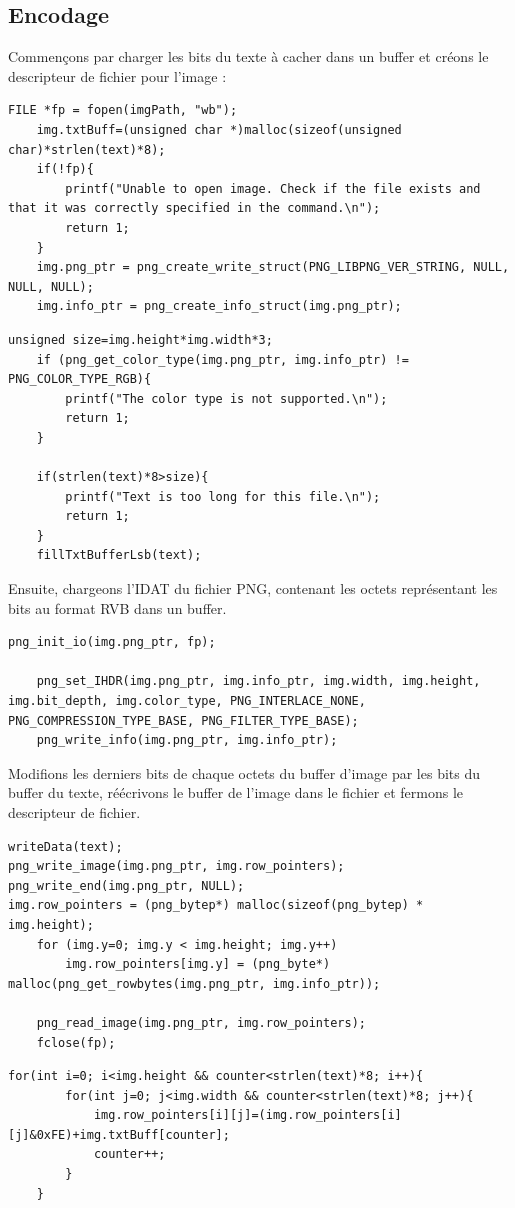 \subsection{Encodage}
Commençons par charger les bits du texte à cacher dans un buffer et créons le descripteur de fichier pour l'image :
\begin{lstlisting}
FILE *fp = fopen(imgPath, "wb");
    img.txtBuff=(unsigned char *)malloc(sizeof(unsigned char)*strlen(text)*8);
    if(!fp){
        printf("Unable to open image. Check if the file exists and that it was correctly specified in the command.\n");
        return 1;
    }
    img.png_ptr = png_create_write_struct(PNG_LIBPNG_VER_STRING, NULL, NULL, NULL);
    img.info_ptr = png_create_info_struct(img.png_ptr);
\end{lstlisting}
\begin{lstlisting}
unsigned size=img.height*img.width*3;
    if (png_get_color_type(img.png_ptr, img.info_ptr) != PNG_COLOR_TYPE_RGB){
        printf("The color type is not supported.\n");
        return 1;
    }

    if(strlen(text)*8>size){
        printf("Text is too long for this file.\n");
        return 1;
    }
    fillTxtBufferLsb(text);
\end{lstlisting}
Ensuite, chargeons l'IDAT du fichier PNG, contenant les octets représentant les bits au format RVB dans un buffer.
\begin{lstlisting}
png_init_io(img.png_ptr, fp);

    png_set_IHDR(img.png_ptr, img.info_ptr, img.width, img.height, img.bit_depth, img.color_type, PNG_INTERLACE_NONE, PNG_COMPRESSION_TYPE_BASE, PNG_FILTER_TYPE_BASE);
    png_write_info(img.png_ptr, img.info_ptr);
\end{lstlisting}
Modifions les derniers bits de chaque octets du buffer d'image par les bits du buffer du texte, réécrivons le buffer de l'image dans le fichier et fermons le descripteur de fichier.
\begin{lstlisting}
writeData(text);
png_write_image(img.png_ptr, img.row_pointers);
png_write_end(img.png_ptr, NULL);
img.row_pointers = (png_bytep*) malloc(sizeof(png_bytep) * img.height);
    for (img.y=0; img.y < img.height; img.y++)
        img.row_pointers[img.y] = (png_byte*) malloc(png_get_rowbytes(img.png_ptr, img.info_ptr));

    png_read_image(img.png_ptr, img.row_pointers);
    fclose(fp);
\end{lstlisting} 
\begin{lstlisting}
for(int i=0; i<img.height && counter<strlen(text)*8; i++){
        for(int j=0; j<img.width && counter<strlen(text)*8; j++){
            img.row_pointers[i][j]=(img.row_pointers[i][j]&0xFE)+img.txtBuff[counter];
            counter++;
        }
    }
\end{lstlisting}
